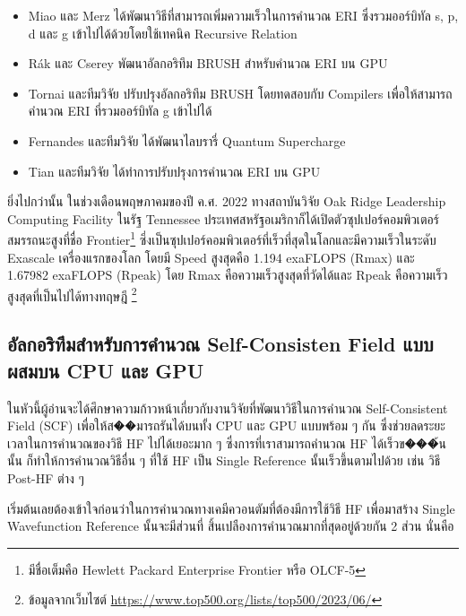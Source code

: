 \begin{itemize}[topsep=0pt,noitemsep]
  \item Miao และ Merz ได้พัฒนาวิธีที่สามารถเพิ่มความเร็วในการคำนวณ ERI ซึ่งรวมออร์บิทัล s, p, d\autocite{miao2013} และ g
        เข้าไปได้ด้วยโดยใช้เทคนิค Recursive Relation\autocite{miao2015}

  \item Rák และ Cserey พัฒนาอัลกอริทึม BRUSH สำหรับคำนวณ ERI บน GPU\autocite{rak2015}

  \item Tornai และทีมวิจัย ปรับปรุงอัลกอริทึม BRUSH โดยทดสอบกับ Compilers เพื่อให้สามารถคำนวณ ERI ที่รวมออร์บิทัล g เข้าไปได้%
        \autocite{tornai2019}

  \item Fernandes และทีมวิจัย ได้พัฒนาไลบรารี่ Quantum Supercharge\autocite{fernandes2015}

  \item Tian และทีมวิจัย ได้ทำการปรับปรุงการคำนวณ ERI บน GPU\autocite{tian2021}
\end{itemize}

ยิ่งไปกว่านั้น ในช่วงเดือนพฤษภาคมของปี ค.ศ. 2022 ทางสถาบันวิจัย Oak Ridge Leadership Computing Facility ในรัฐ Tennessee
ประเทศสหรัฐอเมริกาก็ได้เปิดตัวซุปเปอร์คอมพิวเตอร์สมรรถนะสูงที่ชื่อ Frontier\footnote{มีชื่อเต็มคือ Hewlett Packard Enterprise Frontier
  หรือ OLCF-5} ซึ่งเป็นซุปเปอร์คอมพิวเตอร์ที่เร็วที่สุดในโลกและมีความเร็วในระดับ Exascale เครื่องแรกของโลก โดยมี Speed สูงสุดคือ 1.194
exaFLOPS (Rmax) และ 1.67982 exaFLOPS (Rpeak) โดย Rmax คือความเร็วสูงสุดที่วัดได้และ Rpeak คือความเร็วสูงสุดที่เป็นไปได้ทางทฤษฎี%
\footnote{ข้อมูลจากเว็บไซต์ \url{https://www.top500.org/lists/top500/2023/06/}}

\subsection{อัลกอริทึมสำหรับการคำนวณ Self-Consisten Field แบบผสมบน CPU และ GPU}

ในหัวนี้ผู้อ่านจะได้ศึกษาความก้าวหน้าเกี่ยวกับงานวิจัยที่พัฒนาวิธีในการคำนวณ Self-Consistent Field (SCF) เพื่อให้ส��มารถรันได้บนทั้ง CPU
และ GPU แบบพร้อม ๆ กัน ซึ่งช่วยลดระยะเวลาในการคำนวณของวิธี HF ไปได้เยอะมาก ๆ ซึ่งการที่เราสามารถคำนวณ HF ได้เร็วข���้นนั้น
ก็ทำให้การคำนวณวิธีอื่น ๆ ที่ใช้ HF เป็น Single Reference นั้นเร็วขึ้นตามไปด้วย เช่น วิธี Post-HF ต่าง ๆ

เริ่มต้นเลยต้องเข้าใจก่อนว่าในการคำนวณทางเคมีควอนตัมที่ต้องมีการใช้วิธี HF เพื่อมาสร้าง Single Wavefunction Reference นั้นจะมีส่วนที่%
สิ้นเปลืองการคำนวณมากที่สุดอยู่ด้วยกัน 2 ส่วน นั่นคือ


